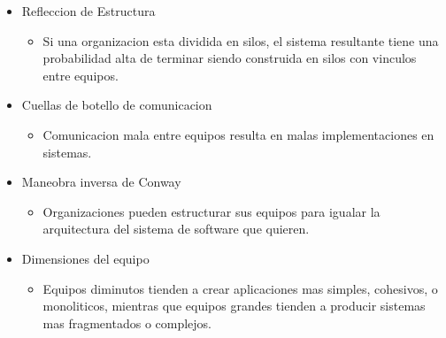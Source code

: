 \documentclass[11pt]{article}
\begin{document}
\begin{itemize}
	\item Refleccion de Estructura
		\begin{itemize}
			\item Si una organizacion esta dividida en silos, el sistema resultante tiene una probabilidad alta de terminar siendo construida en silos con vinculos entre equipos.
		\end{itemize}
		
	\item Cuellas de botello de comunicacion
		\begin{itemize}
			\item Comunicacion mala entre equipos resulta en malas implementaciones en sistemas.
		\end{itemize}

	\item Maneobra inversa de Conway
		\begin{itemize}
			\item Organizaciones pueden estructurar sus equipos para igualar la arquitectura del sistema de software que quieren.
		\end{itemize}
	
	\item Dimensiones del equipo
		\begin{itemize}
			\item Equipos diminutos tienden a crear aplicaciones mas simples, cohesivos, o monoliticos, mientras que equipos grandes tienden a producir sistemas mas fragmentados o complejos.
		\end{itemize}
\end{itemize}
\end{document}
